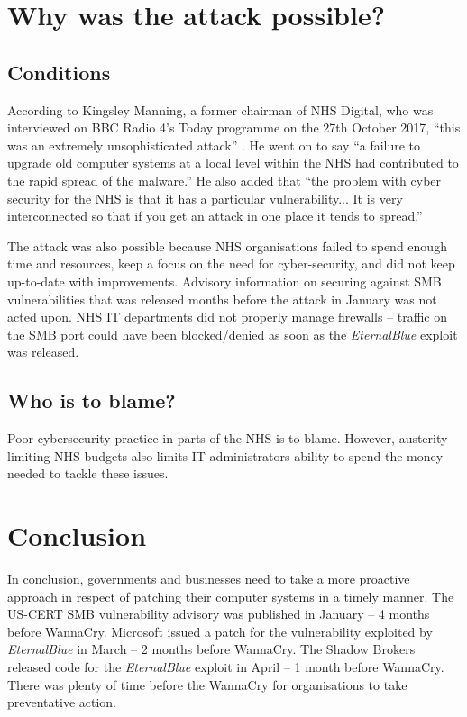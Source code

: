 \documentclass[12pt]{article}
\begin{document}
\section{Why was the attack possible?}
\subsection{Conditions}
According to Kingsley Manning, a former chairman of NHS Digital, who was interviewed on BBC Radio 4's Today programme on the 27th October 2017, ``this was an extremely unsophisticated attack'' \citep{radiointerview:bbcr4:today:20171027}. He went on to say ``a failure to upgrade old computer systems at a local level within the NHS had contributed to the rapid spread of the malware.'' He also added that ``the problem with cyber security for the NHS is that it has a particular vulnerability... It is very interconnected so that if you get an attack in one place it tends to spread.''

The attack was also possible because NHS organisations failed to spend enough time and resources, keep a focus on the need for cyber-security, and did not keep up-to-date with improvements. Advisory information on securing against SMB vulnerabilities that was released months before the attack in January was not acted upon. NHS IT departments did not properly manage firewalls -- traffic on the SMB port could have been blocked/denied as soon as the \textit{EternalBlue} exploit was released.

\subsection{Who is to blame?}
Poor cybersecurity practice in parts of the NHS is to blame. However, austerity limiting NHS budgets also limits IT administrators ability to spend the money needed to tackle these issues.


\section{Conclusion}
In conclusion, governments and businesses need to take a more proactive approach in respect of patching their computer systems in a timely manner. The US-CERT SMB vulnerability advisory was published in January -- 4 months before WannaCry. Microsoft issued a patch for the vulnerability exploited by \textit{EternalBlue} in March -- 2 months before WannaCry. The Shadow Brokers released code for the \textit{EternalBlue} exploit in April -- 1 month before WannaCry. There was plenty of time before the WannaCry for organisations to take preventative action.

\pagebreak


\raggedright

\end{document}
